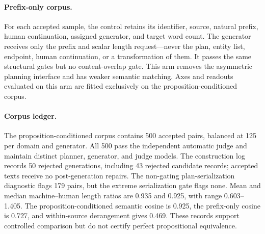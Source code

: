 \paragraph{Prefix-only corpus.} For each accepted sample, the control retains its identifier, source, natural prefix, human continuation, assigned generator, and target word count. The generator receives only the prefix and scalar length request---never the plan, entity list, endpoint, human continuation, or a transformation of them. It passes the same structural gates but no content-overlap gate. This arm removes the asymmetric planning interface and has weaker semantic matching. Axes and readouts evaluated on this arm are fitted exclusively on the proposition-conditioned corpus.

\paragraph{Corpus ledger.} The proposition-conditioned corpus contains 500 accepted pairs, balanced at 125 per domain and generator. All 500 pass the independent automatic judge and maintain distinct planner, generator, and judge models. The construction log records 50 rejected generations, including 43 rejected candidate records; accepted texts receive no post-generation repairs. The non-gating plan-serialization diagnostic flags 179 pairs, but the extreme serialization gate flags none. Mean and median machine--human length ratios are 0.935 and 0.925, with range 0.603--1.405. The proposition-conditioned semantic cosine is 0.925, the prefix-only cosine is 0.727, and within-source derangement gives 0.469. These records support controlled comparison but do not certify perfect propositional equivalence.

